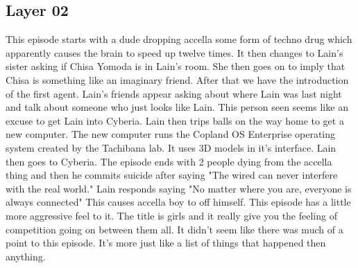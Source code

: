 \documentclass[12pt]{extarticle}
\theoremstyle{plain}
\theoremstyle{plain}
\theoremstyle{plain}
\theoremstyle{Definition}
\theoremstyle{Definition}
\theoremstyle{plain}
\theoremstyle{plain}
\begin{document}
		\subsection{Layer 02}
			This episode starts with a dude dropping accella some form of techno drug which apparently causes the brain to speed up twelve times. It then changes to Lain's sister asking if Chisa Yomoda is in Lain's room. She then goes on to imply that Chisa is something like an imaginary friend. After that we have the introduction of the first agent. Lain's friends appear asking about where Lain was last night and talk about someone who just looks like Lain. This person seen seems like an excuse to get Lain into Cyberia. Lain then trips balls on the way home to get a new computer. The new computer runs the Copland OS Enterprise operating system created by the Tachibana lab. It uses 3D models in it's interface. Lain then goes to Cyberia. The episode ends with 2 people dying from the accella thing and then he commits suicide after saying "The wired can never interfere with the real world." Lain responds saying "No matter where you are, everyone is always connected" This causes accella boy to off himself. This episode has a little more aggressive feel to it. The title is girls and it really give you the feeling of competition going on between them all. It didn't seem like there was much of a point to this episode. It's more just like a list of things that happened then anything. 
\end{document}
